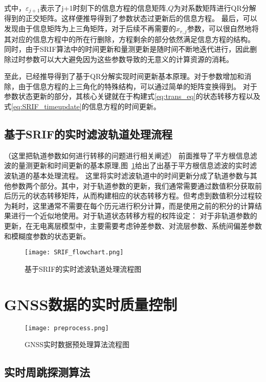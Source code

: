 式中，\(\varepsilon_{j+1}\)表示了j+1时刻下的信息方程的信息矩阵,\(Q\)为对系数矩阵进行QR分解得到的正交矩阵。这样便推导得到了参数状态过更新后的信息方程。
最后，可以发现由于信息矩阵为上三角矩阵，对于后续不再需要的\(x_{r,j}\)参数，可以很自然地将其对应的信息方程中的所在行删除，方程剩余的部分依然满足信息方程的结构。
同时，由于SRIF算法中的时间更新和量测更新是随时间不断地迭代进行，因此删除过时参数可以大大避免因为这些参数导致的无意义的计算资源的消耗。

至此，已经推导得到了基于QR分解实现时间更新基本原理。对于参数增加和消除，由于信息方程的上三角化的特殊结构，可以通过简单的矩阵变换得到。
对于参数状态更新的部分，其核心关键就在于构建式\eqref{eq:trans_eq}的状态转移方程以及式\eqref{eq:SRIF_timeupdate}的信息方程的时间更新。

\subsection{基于SRIF的实时滤波轨道处理流程}

（这里把轨道参数如何进行转移的问题进行相关阐述）
前面推导了平方根信息滤波的量测更新和时间更新的基本原理,图~\ref{fig:SRIF_flowchart}给出了出基于平方根信息滤波的实时滤波轨道的基本处理流程。
这里将实时滤波轨道中的时间更新分成了轨道参数与其他参数两个部分。其中，对于轨道参数的更新，我们通常需要通过数值积分获取前后历元的状态转移矩阵，从而构建相应的状态转移方程。但考虑到数值积分过程较为耗时，这里通常不需要在每个历元进行积分计算，而是使用之前的积分的计算结果进行一个近似地使用。对于轨道状态转移方程的权阵设定：
对于非轨道参数的更新，在无电离层模型中，主要需要考虑钟差参数、对流层参数、系统间偏差参数和模糊度参数的状态更新。
\begin{figure}
  \centering
  \texttt{[image: SRIF\_flowchart.png]}
  \caption{基于SRIF的实时滤波轨道处理流程图}
  \label{fig:SRIF_flowchart}
\end{figure}


\section{GNSS数据的实时质量控制}

\begin{figure}
  \centering
  \texttt{[image: preprocess.png]}
  \caption{GNSS实时数据预处理算法流程图}
  \label{fig:tb_flowchart}
\end{figure}

\subsection{实时周跳探测算法}

